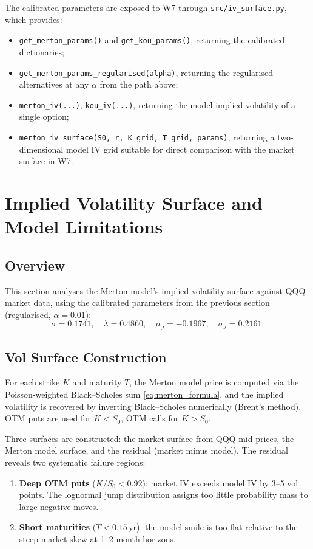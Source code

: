 \documentclass[12pt]{article}
\begin{document}
The calibrated parameters are exposed to W7 through
\texttt{src/iv\_surface.py}, which provides:
\begin{itemize}[leftmargin=*]
   \item \texttt{get\_merton\_params()} and \texttt{get\_kou\_params()},
         returning the calibrated dictionaries;
   \item \texttt{get\_merton\_params\_regularised(alpha)}, returning the
         regularised alternatives at any $\alpha$ from the path above;
   \item \texttt{merton\_iv(...)}, \texttt{kou\_iv(...)}, returning the
         model implied volatility of a single option;
   \item \texttt{merton\_iv\_surface(S0, r, K\_grid, T\_grid, params)},
         returning a two-dimensional model IV grid suitable for direct
         comparison with the market surface in W7.
\end{itemize}


\section*{Implied Volatility Surface and Model Limitations}

\subsection*{Overview}

This section analyses the Merton model's implied volatility surface against
QQQ market data, using the calibrated parameters from the previous section
(regularised, $\alpha=0.01$):
\[
    \sigma = 0.1741,\quad \lambda = 0.4860,\quad
    \mu_J = -0.1967,\quad \sigma_J = 0.2161.
\]

\subsection*{Vol Surface Construction}

For each strike $K$ and maturity $T$, the Merton model price is computed via
the Poisson-weighted Black--Scholes sum \eqref{eq:merton_formula}, and the
implied volatility is recovered by inverting Black--Scholes numerically
(Brent's method). OTM puts are used for $K < S_0$, OTM calls for $K > S_0$.

Three surfaces are constructed: the market surface from QQQ mid-prices, the
Merton model surface, and the residual (market minus model). The residual
reveals two systematic failure regions:
\begin{enumerate}
    \item \textbf{Deep OTM puts} ($K/S_0 < 0.92$): market IV exceeds model IV
    by 3--5 vol points. The lognormal jump distribution assigns too little
    probability mass to large negative moves.
    \item \textbf{Short maturities} ($T < 0.15$\,yr): the model smile is too
    flat relative to the steep market skew at 1--2 month horizons.
\end{enumerate}
\end{document}
